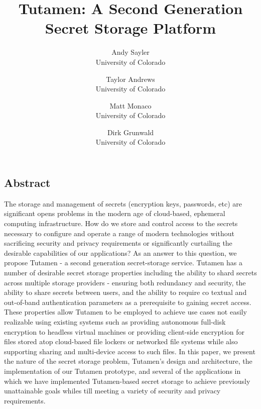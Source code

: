 \documentclass[letterpaper,twocolumn,10pt]{article}
\begin{document}
\date{}

\title{\Large \bf Tutamen: A Second Generation Secret Storage Platform}

\author{
{\rm Andy Sayler}\\
University of Colorado
\and
{\rm Taylor Andrews}\\
University of Colorado
\and
{\rm Matt Monaco}\\
University of Colorado
\and
{\rm Dirk Grunwald}\\
University of Colorado
} %

\maketitle


\subsection*{Abstract}

The storage and management of secrets (encryption keys, passwords,
etc) are significant opens problems in the modern age of cloud-based,
ephemeral computing infrastructure. How do we store and control access
to the secrets necessary to configure and operate a range of modern
technologies without sacrificing security and privacy requirements or
significantly curtailing the desirable capabilities of our
applications? As an answer to this question, we propose Tutamen - a
second generation secret-storage service. Tutamen has a number of
desirable secret storage properties including the ability to shard
secrets across multiple storage providers - ensuring both redundancy
and security, the ability to share secrets between users, and the
ability to require co textual and out-of-band authentication
parameters as a prerequisite to gaining secret access. These
properties allow Tutamen to be employed to achieve use cases not
easily realizable using existing systems such as providing autonomous
full-disk encryption to headless virtual machines or providing
client-side encryption for files stored atop cloud-based file lockers
or networked file systems while also supporting sharing and
multi-device access to such files. In this paper, we present the
nature of the secret storage problem, Tutamen's design and
architecture, the implementation of our Tutamen prototype, and several
of the applications in which we have implemented Tutamen-based secret
storage to achieve previously unattainable goals whiles till meeting a
variety of security and privacy requirements.
\end{document}
